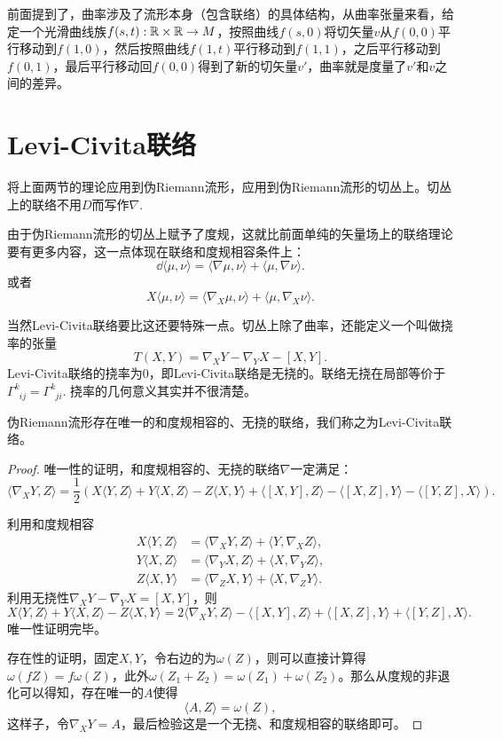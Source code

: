 前面提到了，曲率涉及了流形本身（包含联络）的具体结构，从曲率张量来看，给定一个光滑曲线族$f(s,t):\mathbb{R}\times \mathbb{R}\to M$，按照曲线$f(s,0)$将切矢量$v$从$f(0,0)$平行移动到$f(1,0)$，然后按照曲线$f(1,t)$平行移动到$f(1,1)$，之后平行移动到$f(0,1)$，最后平行移动回$f(0,0)$得到了新的切矢量$v'$，曲率就是度量了$v'$和$v$之间的差异。

\section{Levi-Civita联络}
将上面两节的理论应用到伪Riemann流形，应用到伪Riemann流形的切丛上。切丛上的联络不用$D$而写作$\nabla$.

由于伪Riemann流形的切丛上赋予了度规，这就比前面单纯的矢量场上的联络理论要有更多内容，这一点体现在联络和度规相容条件上：
\[
	\dd \langle \mu,\nu\rangle=\langle \nabla\mu,\nu\rangle+\langle\mu,\nabla\nu\rangle.
\]
或者
\[
	X \langle \mu,\nu\rangle=\langle \nabla_X\mu,\nu\rangle+\langle\mu,\nabla_X\nu\rangle.
\]

当然Levi-Civita联络要比这还要特殊一点。切丛上除了曲率，还能定义一个叫做挠率的张量
\[
	T(X,Y)=\nabla_X Y-\nabla_Y X-[X,Y].
\]
Levi-Civita联络的挠率为0，即Levi-Civita联络是无挠的。联络无挠在局部等价于$\Gamma^{k}_{\phantom{k}ij}=\Gamma^{k}_{\phantom{k}ji}$. 挠率的几何意义其实并不很清楚。

\begin{theo}
伪Riemann流形存在唯一的和度规相容的、无挠的联络，我们称之为Levi-Civita联络。
\end{theo}
\begin{proof}
唯一性的证明，和度规相容的、无挠的联络$\nabla$一定满足：
\[
	\langle \nabla_XY,Z\rangle=\frac{1}{2}\left(X\langle Y,Z\rangle+Y\langle X,Z\rangle-Z\langle X,Y\rangle+\langle[X,Y],Z\rangle-\langle[X,Z],Y\rangle-\langle[Y,Z],X\rangle\right).
\]

利用和度规相容
\begin{align*}
	X\langle Y,Z\rangle&=\langle \nabla_XY,Z\rangle+\langle Y,\nabla_XZ\rangle,\\
	Y\langle X,Z\rangle&=\langle \nabla_YX,Z\rangle+\langle X,\nabla_YZ\rangle,\\
	Z\langle X,Y\rangle&=\langle \nabla_ZX,Y\rangle+\langle X,\nabla_ZY\rangle.
\end{align*}
利用无挠性$\nabla_X Y-\nabla_Y X=[X,Y]$，则
\[
	X\langle Y,Z\rangle+Y\langle X,Z\rangle-Z\langle X,Y\rangle=2\langle \nabla_XY,Z\rangle-\langle[X,Y],Z\rangle+\langle[X,Z],Y\rangle+\langle[Y,Z],X\rangle.
\]
唯一性证明完毕。

存在性的证明，固定$X,Y$，令右边的为$\omega(Z)$，则可以直接计算得$\omega(fZ)=f\omega(Z)$，此外$\omega(Z_1+Z_2)=\omega(Z_1)+\omega(Z_2)$。那么从度规的非退化可以得知，存在唯一的$A$使得
\[
	\langle A,Z\rangle=\omega(Z),
\]
这样子，令$\nabla_XY=A$，最后检验这是一个无挠、和度规相容的联络即可。
\end{proof}

